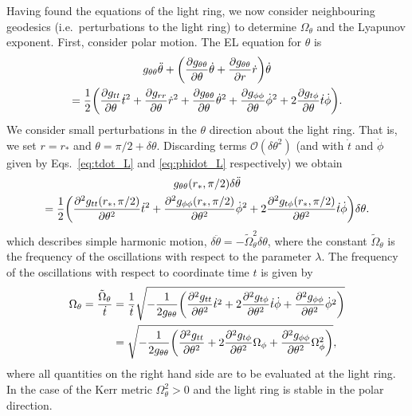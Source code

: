 Having found the equations of the light ring, we now consider neighbouring geodesics (i.e.\ perturbations to the light ring) to determine $\Omega_\theta$ and the Lyapunov exponent. 
First, consider polar motion. 
The EL equation for $\theta$ is 
\begin{multline}\label{eq:el_theta}
	g_{\theta \theta} \ddot{\theta} + \qty(\pdv{g_{\theta \theta}}{\theta} \dot{\theta} + \pdv{g_{\theta \theta}}{r} \dot{r}) \dot{\theta} \\
	= \frac{1}{2} \bigg(\pdv{g_{t t}}{\theta} \dot{t}^2 + \pdv{g_{r r}}{\theta} \dot{r}^2 + \pdv{g_{\theta \theta}}{\theta} \dot{\theta}^2 + \pdv{g_{\phi \phi}}{\theta} \dot{\phi}^2 + 2\pdv{g_{t \phi}}{\theta} \dot{t}\dot{\phi}\bigg).
\end{multline}
We consider small perturbations in the $\theta$ direction about the light ring.
That is, we set $r = r_*$ and $\theta = \pi/2+\delta\theta$.
Discarding terms $\mathcal{O}(\delta\theta^2)$ (and with $\dot{t}$ and $\dot{\phi}$ given by Eqs.~\ref{eq:tdot_L} and \ref{eq:phidot_L} respectively) we obtain
\begin{multline}\label{eq:el_theta_expanded}
	g_{\theta \theta}(r_*,\pi/2) \delta\ddot{\theta} \\
 = \frac{1}{2} \bigg(\pdv[2]{g_{t t}(r_*,\pi/2)}{\theta} \dot{t}^2 + \pdv[2]{g_{\phi\phi}(r_*,\pi/2)}{\theta} \dot{\phi}^2 + 2\pdv[2]{g_{t \phi}(r_*,\pi/2)}{\theta} \dot{t}\dot{\phi}\bigg)\delta\theta.
\end{multline}
which describes simple harmonic motion, $\delta\ddot{\theta} = -\tilde{\Omega}^2_\theta \delta\theta$, where the constant $\tilde{\Omega}_\theta$ is the frequency of the oscillations with respect to the parameter $\lambda$.
The frequency of the oscillations with respect to coordinate time $t$ is given by
\begin{align}
    \Omega_\theta = \frac{\tilde{\Omega}_\theta}{\dot{t}} &= \frac{1}{\dot{t}} \sqrt{-\frac{1}{2g_{\theta\theta}}\qty(\pdv[2]{g_{tt}}{\theta}\dot{t}^2 + 2\pdv[2]{g_{t\phi}}{\theta}\dot{t}\dot{\phi} + \pdv[2]{g_{\phi\phi}}{\theta}\dot{\phi}^2)} \nonumber \\
    &= \sqrt{-\frac{1}{2g_{\theta\theta}}\qty(\pdv[2]{g_{tt}}{\theta} + 2\pdv[2]{g_{t\phi}}{\theta}\Omega_\phi + \pdv[2]{g_{\phi\phi}}{\theta}\Omega_\phi^2)},
\end{align}
where all quantities on the right hand side are to be evaluated at the light ring. 
In the case of the Kerr metric $\Omega_\theta^2 > 0$ and the light ring is stable in the polar direction.

